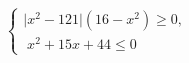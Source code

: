 \begin{ex}[type=ineq_system]
	\begin{condition}
		$\begin{cases}\big|x^2 - 121\big|(16 - x^2)\geqslant0  ,\\
			\; x^2 + 15x + 44\leqslant0 
		\end{cases}$
	\end{condition}
\end{ex}